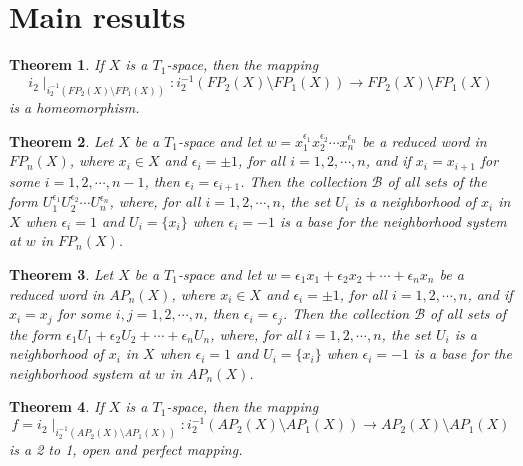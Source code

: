 \documentclass{amsart}
\newtheorem{theorem}{Theorem}[section]
\theoremstyle{definition}
\begin{document}
\section{Main results}
\begin{theorem}\label{t0}\cite{EN2013}
If $X$ is a $T_{1}$-space, then the mapping $$i_{2}\mid _{i_{2}^{-1}(FP_{2}(X)\setminus FP_{1}(X))}: i_{2}^{-1}(FP_{2}(X)\setminus FP_{1}(X))\longrightarrow FP_{2}(X)\setminus FP_{1}(X)$$ is a homeomorphism.
\end{theorem}

\begin{theorem}\label{t9}\cite{EN2012}
Let $X$ be a $T_{1}$-space and let $w=x_{1}^{\epsilon_{1}}x_{2}^{\epsilon_{2}}\cdots x_{n}^{\epsilon_{n}}$ be a reduced word in $FP_{n}(X)$, where $x_{i}\in X$ and $\epsilon_{i}=\pm 1$, for all $i=1, 2, \cdots, n$, and if $x_{i}=x_{i+1}$ for some $i=1, 2, \cdots, n-1$, then $\epsilon_{i}=\epsilon_{i+1}$. Then the collection $\mathscr{B}$ of all sets of the form $U_{1}^{\epsilon_{1}}U_{2}^{\epsilon_{2}}\cdots U_{n}^{\epsilon_{n}}$, where, for all $i=1, 2, \cdots, n$, the set $U_{i}$ is a neighborhood of $x_{i}$ in $X$ when $\epsilon_{i}=1$ and $U_{i}=\{x_{i}\}$ when $\epsilon_{i}=-1$ is a base for the neighborhood system at $w$ in $FP_{n}(X)$.
\end{theorem}

\begin{theorem}\label{t2}\cite{EN2012}
Let $X$ be a $T_{1}$-space and let $w=\epsilon_{1}x_{1}+\epsilon_{2}x_{2}+\cdots+\epsilon_{n}x_{n}$ be a reduced word in $AP_{n}(X)$, where $x_{i}\in X$ and $\epsilon_{i}=\pm 1$, for all $i=1, 2, \cdots, n$, and if $x_{i}=x_{j}$ for some $i, j=1, 2, \cdots, n$, then $\epsilon_{i}=\epsilon_{j}$. Then the collection $\mathscr{B}$ of all sets of the form $\epsilon_{1}U_{1}+\epsilon_{2}U_{2}+\cdots+\epsilon_{n}U_{n}$, where, for all $i=1, 2, \cdots, n$, the set $U_{i}$ is a neighborhood of $x_{i}$ in $X$ when $\epsilon_{i}=1$ and $U_{i}=\{x_{i}\}$ when $\epsilon_{i}=-1$ is a base for the neighborhood system at $w$ in $AP_{n}(X)$.
\end{theorem}

\begin{theorem}\label{t3}
If $X$ is a $T_{1}$-space, then the mapping $$f=i_{2}\mid _{i_{2}^{-1}(AP_{2}(X)\setminus AP_{1}(X))}: i_{2}^{-1}(AP_{2}(X)\setminus AP_{1}(X))\longrightarrow AP_{2}(X)\setminus AP_{1}(X)$$ is a 2 to 1, open and perfect mapping.
\end{theorem}
\end{document}
